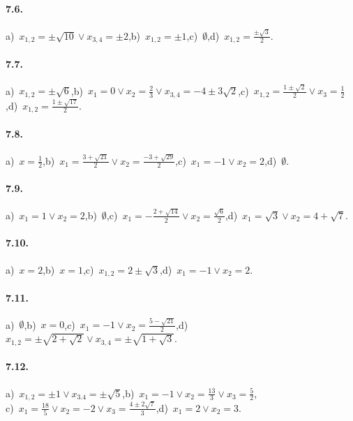 \paragraph{7.6.} a)~$x_{1,2}=\pm \sqrt{10}\vee x_{3,4}=\pm 2$,\quad b)~$x_{1,2}=\pm 1$,\quad c)~$\emptyset $,\quad d)~$x_{1,2}=\frac{\pm \sqrt 3} 2$.

\paragraph{7.7.} a)~$x_{1,2}=\pm \sqrt 6$,\quad b)~$x_1=0\vee x_2=\frac 2 3\vee x_{3,4}=-4\pm 3\sqrt 2$,\quad c)~$x_{1,2}=\frac{1\pm \sqrt 2} 2\vee x_3=\frac 1 2$,\quad d)~$x_{1,2}=\frac{1\pm \sqrt{17}} 2$.

\paragraph{7.8.} a)~$x=\frac 1 2$,\quad b)~$x_1=\frac{3+\sqrt{21}} 2\vee x_2=\frac{-3+\sqrt{29}} 2$,\quad c)~$x_1=-1\vee x_2=2$,\quad d)~$\emptyset $.

\paragraph{7.9.} a)~$x_1=1\vee x_2=2$,\quad b)~$\emptyset $,\quad c)~$x_1=-\frac{2+\sqrt{14}} 2\vee x_2=\frac{\sqrt 6} 2$,\quad d)~$x_1=\sqrt 3\vee x_2=4+\sqrt 7$.

\paragraph{7.10.} a)~$x=2$,\quad b)~$x=1$,\quad c)~$x_{1,2}=2\pm \sqrt 3$,\quad d)~$x_1=-1\vee x_2=2$.

\paragraph{7.11.} a)~$\emptyset $,\quad b)~$ x=0 $,\quad c)~$x_1=-1\vee x_2=\frac{5-\sqrt{21}} 2$,\quad d)~$x_{1,2}=\pm \sqrt{2+\sqrt 2}\vee x_{3,4}=\pm \sqrt{1+\sqrt 3}$.

\paragraph{7.12.} a)~$x_{1,2}=\pm 1\vee x_{3.4}=\pm \sqrt 5$,\quad b)~$x_1=-1\vee x_2=\frac{13} 3\vee x_3=\frac 5 2$,\protect\\
\quad c)~$x_1=\frac{18} 5\vee x_2=-2\vee x_3=\frac{4\pm 2\sqrt 7} 3$,\quad d)~$x_1=2\vee x_2=3$.


